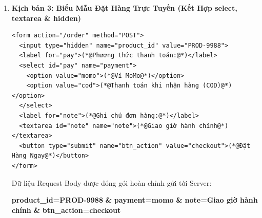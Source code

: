 \documentclass[11pt,oneside]{book}
\newcommand{\codeinline}[1]{\textcolor{accentOrange}{\texttt{#1}}}
\begin{document}
\begin{enumerate}[leftmargin=1.5em, itemsep=8pt, parsep=0pt]
\begin{browserWindow}
\sffamily\small
Khi bấm \textbf{"Lọc kết quả"}, trình duyệt nối tất cả thuộc tính \codeinline{name} và \codeinline{value} thành URL:
\begin{tcolorbox}[colback=codeBg, colframe=primaryBlue!40, arc=4pt, boxrule=0.8pt, left=10pt, right=10pt, top=6pt, bottom=6pt]
\textcolor{primaryBlue}{\textbf{/search}}\textcolor{darkText}{\textbf{?}}\textcolor{accentOrange}{\textbf{q}}\textcolor{darkText}{\textbf{=}}\textcolor{primaryBlue}{\textbf{iPhone}}\textcolor{darkText}{\textbf{\&}}\textcolor{accentOrange}{\textbf{price\_min}}\textcolor{darkText}{\textbf{=}}\textcolor{primaryBlue}{\textbf{1000}}\textcolor{darkText}{\textbf{\&}}\textcolor{accentOrange}{\textbf{price\_max}}\textcolor{darkText}{\textbf{=}}\textcolor{primaryBlue}{\textbf{2000}}\textcolor{darkText}{\textbf{\&}}\textcolor{accentOrange}{\textbf{in\_stock}}\textcolor{darkText}{\textbf{=}}\textcolor{primaryBlue}{\textbf{1}}
\end{tcolorbox}
\end{browserWindow}

\item \textbf{Kịch bản 3: Biểu Mẫu Đặt Hàng Trực Tuyến (Kết Hợp select, textarea \& hidden)}
\begin{codeWindow}
\begin{lstlisting}[language=HTML5]
<form action="/order" method="POST">
  <input type="hidden" name="product_id" value="PROD-9988">
  <label for="pay">(*@Phương thức thanh toán:@*)</label>
  <select id="pay" name="payment">
    <option value="momo">(*@Ví MoMo@*)</option>
    <option value="cod">(*@Thanh toán khi nhận hàng (COD)@*)</option>
  </select>
  <label for="note">(*@Ghi chú đơn hàng:@*)</label>
  <textarea id="note" name="note">(*@Giao giờ hành chính@*)</textarea>
  <button type="submit" name="btn_action" value="checkout">(*@Đặt Hàng Ngay@*)</button>
</form>
\end{lstlisting}
\end{codeWindow}

\begin{browserWindow}
\sffamily\small
Dữ liệu Request Body được đóng gói hoàn chỉnh gửi tới Server:
\begin{tcolorbox}[colback=codeBg, colframe=primaryBlue!30, arc=4pt, boxrule=0.8pt, left=10pt, right=10pt, top=6pt, bottom=6pt]
\textcolor{accentOrange}{\textbf{product\_id}}\textcolor{darkText}{\textbf{=PROD-9988}} \quad \textcolor{darkText}{\textbf{\&}} \quad
\textcolor{accentOrange}{\textbf{payment}}\textcolor{darkText}{\textbf{=momo}} \quad \textcolor{darkText}{\textbf{\&}} \newline
\textcolor{accentOrange}{\textbf{note}}\textcolor{darkText}{\textbf{=Giao giờ hành chính}} \quad \textcolor{darkText}{\textbf{\&}} \quad
\textcolor{accentOrange}{\textbf{btn\_action}}\textcolor{darkText}{\textbf{=checkout}}
\end{tcolorbox}
\end{browserWindow}
\end{enumerate}
\end{document}
